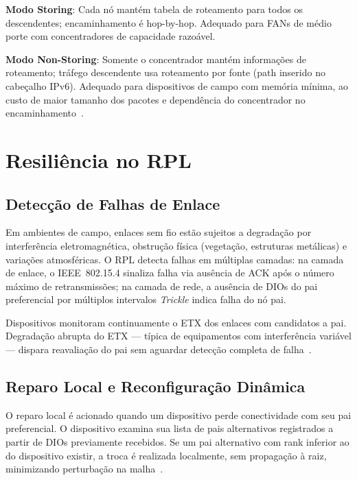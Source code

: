 \documentclass[conference]{IEEEtran}
\begin{document}
\textbf{Modo Storing}: Cada nó mantém tabela de roteamento para todos os
descendentes; encaminhamento é hop-by-hop. Adequado para FANs de médio porte
com concentradores de capacidade razoável.

\textbf{Modo Non-Storing}: Somente o concentrador mantém informações de
roteamento; tráfego descendente usa roteamento por fonte (path inserido no
cabeçalho IPv6). Adequado para dispositivos de campo com memória mínima, ao
custo de maior tamanho dos pacotes e dependência do concentrador no
encaminhamento~\cite{winter2012rpl}.

\section{Resiliência no RPL}
\label{sec:resilience}

\subsection{Detecção de Falhas de Enlace}

Em ambientes de campo, enlaces sem fio estão sujeitos a degradação por
interferência eletromagnética, obstrução física (vegetação, estruturas metálicas)
e variações atmosféricas. O RPL detecta falhas em múltiplas camadas: na camada
de enlace, o IEEE~802.15.4 sinaliza falha via ausência de ACK após o número
máximo de retransmissões; na camada de rede, a ausência de DIOs do pai
preferencial por múltiplos intervalos \textit{Trickle} indica falha do nó pai.

Dispositivos monitoram continuamente o ETX dos enlaces com candidatos a pai.
Degradação abrupta do ETX --- típica de equipamentos com interferência
variável --- dispara reavaliação do pai sem aguardar detecção completa de
falha~\cite{accettura2011rpl}.

\subsection{Reparo Local e Reconfiguração Dinâmica}

O reparo local é acionado quando um dispositivo perde conectividade com seu pai
preferencial. O dispositivo examina sua lista de pais alternativos registrados
a partir de DIOs previamente recebidos. Se um pai alternativo com rank inferior
ao do dispositivo existir, a troca é realizada localmente, sem propagação à
raiz, minimizando perturbação na malha~\cite{winter2012rpl}.
\end{document}
